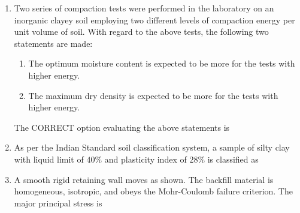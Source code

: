 \documentclass[journal]{IEEEtran}
\begin{document}
\begin{enumerate}
\item Two series of compaction tests were performed in the laboratory on an inorganic clayey soil employing two different levels of compaction energy per unit volume of soil. With regard to the above tests, the following two statements are made: \hfill {}
\begin{enumerate}
\item The optimum moisture content is expected to be more for the tests with higher energy.
\item The maximum dry density is expected to be more for the tests with higher energy.
\end{enumerate}
The CORRECT option evaluating the above statements is
\begin{enumerate}
\end{enumerate}

\item As per the Indian Standard soil classification system, a sample of silty clay with liquid limit of $40\%$ and plasticity index of $28\%$ is classified as \hfill {}
\begin{enumerate}
\end{enumerate}

\item A smooth rigid retaining wall moves as shown. The backfill material is homogeneous, isotropic, and obeys the Mohr-Coulomb failure criterion. The major principal stress is \hfill {}


\end{enumerate}
\end{document}
